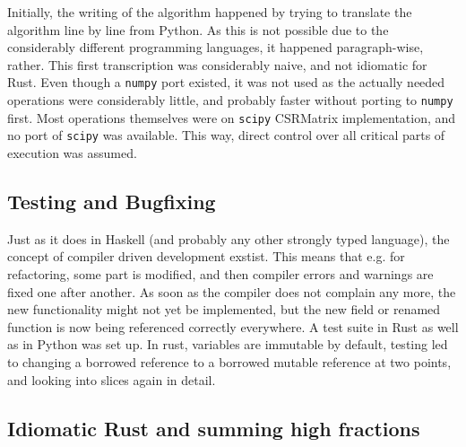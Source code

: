 Initially, the writing of the algorithm happened by trying to translate the
algorithm line by line from Python. As this is not possible due to the
considerably different programming languages, it happened paragraph-wise,
rather. This first transcription was considerably naive, and not idiomatic for
Rust. Even though a \verb|numpy| port existed, it was not used as the actually
needed operations were considerably little, and probably faster without porting
to \verb|numpy| first. Most operations themselves were on \verb|scipy|
CSRMatrix implementation, and no port of \verb|scipy| was available. This way,
direct control over all critical parts of execution was assumed.


\subsection{Testing and Bugfixing}

Just as it does in Haskell (and probably any other strongly typed language),
the concept of compiler driven development exstist. This means that e.g. for
refactoring, some part is modified, and then compiler errors and warnings are
fixed one after another. As soon as the compiler does not complain any more,
the new functionality might not yet be implemented, but the new field or
renamed function is now being referenced correctly everywhere. A test suite in
Rust as well as in Python was set up. In rust, variables are immutable by
default, testing led to changing a borrowed reference to a borrowed mutable
reference at two points, and looking into slices again in detail.


\subsection{Idiomatic Rust and summing high fractions}



